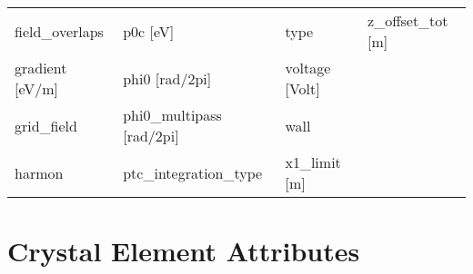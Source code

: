\begin{tabular}{llll}
field_overlaps                 & p0c [eV]                       & type                           & z_offset_tot [m]               \\
gradient [eV/m]                & phi0 [rad/2pi]                 & voltage [Volt]                 &                                \\
grid_field                     & phi0_multipass [rad/2pi]       & wall                           &                                \\
harmon                         & ptc_integration_type           & x1_limit [m]                   &                                \\
 \bottomrule
 \end{tabular}
 \vfill
 
 \section{Crystal Element Attributes}
 \label{s:list.crystal}
 

